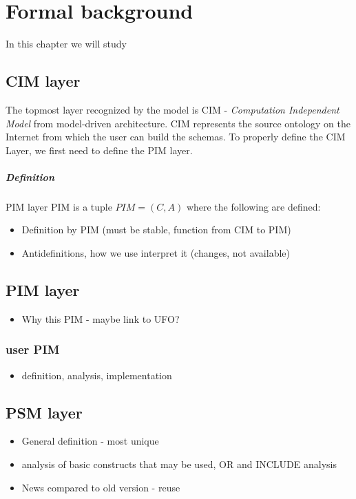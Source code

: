 \chapter{Formal background}
\label{chapters:formal-background}

In this chapter we will study

\section{CIM layer}

The topmost layer recognized by the model is CIM - \textit{Computation Independent Model} from model-driven architecture. CIM represents the source ontology on the Internet from which the user can build the schemas. To properly define the CIM Layer, we first need to define the PIM layer.

\paragraph{Definition} PIM layer $\textrm{PIM}$ is a tuple $PIM = (C, A)$ where the following are defined:


\begin{itemize}
    \item Definition by PIM (must be stable, function from CIM to PIM)
    \item Antidefinitions, how we use interpret it (changes, not available)
\end{itemize}

\section{PIM layer}



\begin{itemize}
    \item Why this PIM - maybe link to UFO?
\end{itemize}

\subsection{user PIM}

\begin{itemize}
    \item definition, analysis, implementation
\end{itemize}

\section{PSM layer}

\begin{itemize}
    \item General definition - most unique
    \item analysis of basic constructs that may be used, OR and INCLUDE analysis
    \item News compared to old version - reuse
\end{itemize}